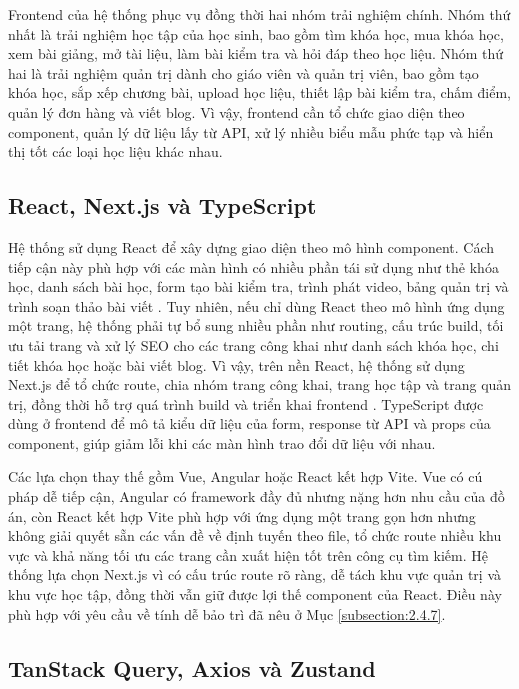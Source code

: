 \documentclass[../DoAn.tex]{subfiles}
\begin{document}
Frontend của hệ thống phục vụ đồng thời hai nhóm trải nghiệm chính. Nhóm thứ nhất là trải nghiệm học tập của học sinh, bao gồm tìm khóa học, mua khóa học, xem bài giảng, mở tài liệu, làm bài kiểm tra và hỏi đáp theo học liệu. Nhóm thứ hai là trải nghiệm quản trị dành cho giáo viên và quản trị viên, bao gồm tạo khóa học, sắp xếp chương bài, upload học liệu, thiết lập bài kiểm tra, chấm điểm, quản lý đơn hàng và viết blog. Vì vậy, frontend cần tổ chức giao diện theo component, quản lý dữ liệu lấy từ API, xử lý nhiều biểu mẫu phức tạp và hiển thị tốt các loại học liệu khác nhau.

\subsection{React, Next.js và TypeScript}
\label{subsection:3.2.1}

Hệ thống sử dụng React để xây dựng giao diện theo mô hình component. Cách tiếp cận này phù hợp với các màn hình có nhiều phần tái sử dụng như thẻ khóa học, danh sách bài học, form tạo bài kiểm tra, trình phát video, bảng quản trị và trình soạn thảo bài viết \cite{react_docs}. Tuy nhiên, nếu chỉ dùng React theo mô hình ứng dụng một trang, hệ thống phải tự bổ sung nhiều phần như routing, cấu trúc build, tối ưu tải trang và xử lý SEO cho các trang công khai như danh sách khóa học, chi tiết khóa học hoặc bài viết blog. Vì vậy, trên nền React, hệ thống sử dụng Next.js để tổ chức route, chia nhóm trang công khai, trang học tập và trang quản trị, đồng thời hỗ trợ quá trình build và triển khai frontend \cite{nextjs_docs}. TypeScript được dùng ở frontend để mô tả kiểu dữ liệu của form, response từ API và props của component, giúp giảm lỗi khi các màn hình trao đổi dữ liệu với nhau.

Các lựa chọn thay thế gồm Vue, Angular hoặc React kết hợp Vite. Vue có cú pháp dễ tiếp cận, Angular có framework đầy đủ nhưng nặng hơn nhu cầu của đồ án, còn React kết hợp Vite phù hợp với ứng dụng một trang gọn hơn nhưng không giải quyết sẵn các vấn đề về định tuyến theo file, tổ chức route nhiều khu vực và khả năng tối ưu các trang cần xuất hiện tốt trên công cụ tìm kiếm. Hệ thống lựa chọn Next.js vì có cấu trúc route rõ ràng, dễ tách khu vực quản trị và khu vực học tập, đồng thời vẫn giữ được lợi thế component của React. Điều này phù hợp với yêu cầu về tính dễ bảo trì đã nêu ở Mục \ref{subsection:2.4.7}.

\subsection{TanStack Query, Axios và Zustand}
\label{subsection:3.2.2}
\end{document}
